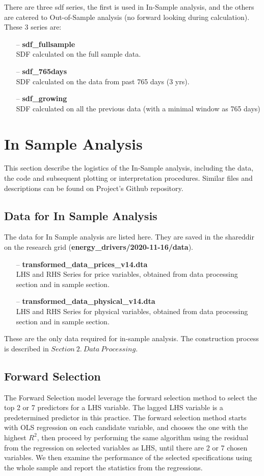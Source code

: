 \documentclass[11pt]{article}
\begin{document}
There are three sdf series, the first is used in In-Sample analysis, and the others are catered to Out-of-Sample analysis (no forward looking during calculation). These 3 series are:
\begin{enumerate}
	\item[--] \textbf{sdf\_fullsample}\\
	SDF calculated on the full sample data.
	\item[--] \textbf{sdf\_765days}\\
	SDF calculated on the data from past 765 days (3 yrs).
	\item[--] \textbf{sdf\_growing}\\
	SDF calculated on all the previous data (with a minimal window as 765 days)
\end{enumerate}

\section{In Sample Analysis}
This section describe the logistics of the In-Sample analysis, including the data, the code and subsequent plotting or interpretation procedures. Similar files and descriptions can be found on Project's Github repository. 
\subsection{Data for In Sample Analysis}
The data for In Sample analysis are listed here. They are saved in the shareddir on the research grid (\textbf{energy\_drivers/2020-11-16/data}).
\begin{enumerate}
	\item[--] \textbf{transformed\_data\_prices\_v14.dta} \\
	LHS and RHS Series for price variables, obtained from data processing section and in sample section.
	\item[--] \textbf{transformed\_data\_physical\_v14.dta} \\
	LHS and RHS Series for physical variables, obtained from data processing section and in sample section.
\end{enumerate}
These are the only data required for in-sample analysis. The construction process is described in $Section\ 2.\ Data\ Processing$.

\subsection{Forward Selection}
The Forward Selection model leverage the forward selection method to select the top 2 or 7 predictors for a LHS variable. The lagged LHS variable is a predetermined predictor in this practice. The forward selection method starts with OLS regression on each candidate variable, and chooses the one with the highest $R^2$, then proceed by performing the same algorithm using the residual from the regression on selected variables as LHS, until there are 2 or 7 chosen variables. We then examine the performance of the selected specifications using the whole sample and report the statistics from the regressions.
\end{document}
